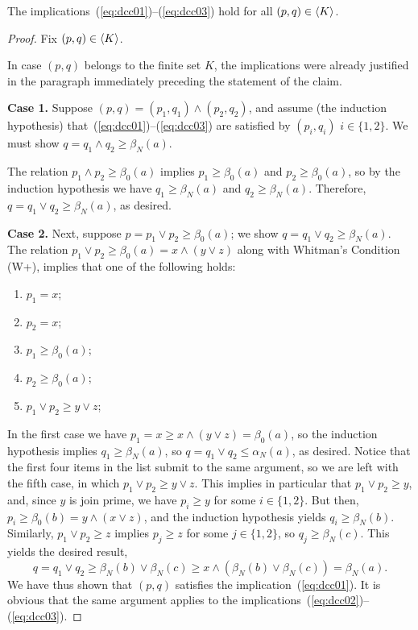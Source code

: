 \begin{claim}\label{claim:main_beta}
  The implications~(\ref{eq:dcc01})--(\ref{eq:dcc03}) hold for all $(p,q) \in \langle K\rangle$.
  \end{claim}
  \begin{proof}
    Fix $(p, q) \in  \langle K\rangle$. 
  
    In case $(p,q)$ belongs to the finite set $K$, the implications were already 
    justified in the paragraph immediately preceding the statement of the claim.
    
    \medskip
    \noindent \textbf{Case 1.}
    Suppose $(p,q) = (p_1, q_1) \wedge (p_2, q_2)$, and assume (the induction hypothesis) 
    that~(\ref{eq:dcc01})--(\ref{eq:dcc03}) are satisfied 
    by $(p_i,q_i)$ $i\in \{1,2\}$.
    We must show $q=q_1\wedge q_2 \geq \beta_N(a)$.

    The relation $p_1\wedge p_2 \geq \beta_0(a)$ implies 
    $p_1\geq \beta_0(a)$ and $p_2\geq \beta_0(a)$, 
    so by the induction hypothesis we have 
    $q_1\geq \beta_N(a)$ and $q_2\geq \beta_N(a)$.  
    Therefore, $q = q_1 \vee q_2 \geq \beta_N(a)$, as desired.
    

    \medskip
    \noindent \textbf{Case 2.}
    Next, suppose $p = p_1\vee p_2 \geq \beta_0(a)$; we show 
    $q = q_1 \vee q_2 \geq \beta_N(a)$. 
    The relation $p_1\vee p_2 \geq \beta_0(a) = x \wedge (y \vee z)$ along with 
    Whitman's Condition (W+), implies that one of the following holds:
    \begin{enumerate}
      \item   $p_1=x$;  
      \item   $p_2=x$;  
      \item   $p_1\geq \beta_0(a)$;  
      \item   $p_2\geq \beta_0(a)$;  
      \item   $p_1\vee p_2 \geq y \vee z$;  
    \end{enumerate}
    In the first case we have $p_1 = x \geq x \wedge (y \vee z) = \beta_0(a)$, so
    the induction hypothesis implies $q_1\geq \beta_N(a)$, so 
    $q = q_1\vee q_2\leq \alpha_N(a)$, as desired.  
    Notice that the first four items in the list submit to the same argument,
    so we are left with the fifth case, 
    in which $p_1\vee p_2 \geq y \vee z$. 
    This implies in particular that $p_1\vee p_2 \geq y$, and, since $y$ is join prime,
    we have $p_i\geq y$ for some $i\in \{1,2\}$.  
    But then, $p_i \geq \beta_0(b) = y\wedge (x\vee z)$, and the induction hypothesis
    yields $q_i \geq \beta_N(b)$.
    Similarly, $p_1\vee p_2 \geq z$ implies 
    $p_j\geq z$ for some $j\in \{1,2\}$, so $q_j \geq \beta_N(c)$.
    This yields the desired result,
    \[
    q = q_1\vee q_2 \geq \beta_N(b) \vee \beta_N(c) 
    \geq x \wedge (\beta_N(b)\vee \beta_N(c)) = \beta_N(a).
    \]                   
    We have thus shown that $(p,q)$ satisfies the implication~(\ref{eq:dcc01}).
    It is obvious that the same argument applies to the 
    implications~(\ref{eq:dcc02})--(\ref{eq:dcc03}).
  \end{proof}
  

